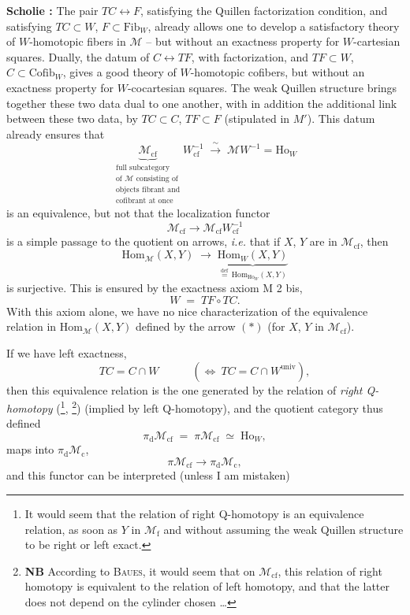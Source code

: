 \documentclass[11pt]{article}
\newcommand{\msp}[1]{\marginpar{\footnotesize [#1]}}
\newcommand{\univ}{\mathrm{univ}}
\newcommand{\Fib}{\mathrm{Fib}}
\begin{document}
\noindent\textbf{Scholie :} The pair $TC \longleftrightarrow F$, satisfying the Quillen factorization condition, and satisfying $TC \subset W$, $F \subset \Fib_W$, already allows one to develop a satisfactory theory of $W$-homotopic fibers in $\mathcal{M}$ -- but without an exactness property for $W$-cartesian squares. Dually, the datum of $C \longleftrightarrow TF$, with factorization, and $TF \subset W$, $C \subset \mathrm{Cofib}_W$, gives a good theory of $W$-homotopic cofibers, but without an exactness property for $W$-cocartesian squares. The weak Quillen structure brings together these two data dual to one another, with in addition the additional link between these two data, by $TC \subset C$, $TF \subset F$ (stipulated in $M'$). This datum already ensures that %
\[
\underbrace{\mathcal{M}_{\mathrm{cf}}}_{\substack{\text{full subcategory}\\ \text{of $\mathcal{M}$ consisting of}\\ \text{objects fibrant and}\\ \text{cofibrant at once}}} W_{\mathrm{cf}}^{-1} \;\xrightarrow{\ \sim\ }\; \mathcal{M}W^{-1} = \mathrm{Ho}_W
\]
\msp{page 30}
is an equivalence, but not that the localization functor
\[
\mathcal{M}_{\mathrm{cf}} \longrightarrow \mathcal{M}_{\mathrm{cf}}W_{\mathrm{cf}}^{-1}
\]
is a simple passage to the quotient on arrows, \textit{i.e.} that if $X$, $Y$ are in $\mathcal{M}_{\mathrm{cf}}$, then
\[
\mathrm{Hom}_{\mathcal{M}}(X, Y) \;\longrightarrow\; \underbrace{\mathrm{Hom}_W(X, Y)}_{\overset{\text{def}}{=}\,\mathrm{Hom}_{\mathrm{Ho}_W}(X, Y)} \tag*{$(*)$}
\]
is surjective. This is ensured by the exactness axiom M 2 bis,
\[
W \;=\; TF \circ TC.
\]
With this axiom alone, we have no nice characterization of the equivalence relation in $\mathrm{Hom}_{\mathcal{M}}(X, Y)$ defined by the arrow $(*)$ (for $X$, $Y$ in $\mathcal{M}_{\mathrm{cf}}$).

If we have left exactness,
\[
TC = C \cap W \qquad\quad (\Longleftrightarrow\ TC = C \cap W^{\univ}),
\]
then this equivalence relation is the one generated by the relation of \textit{right Q-homotopy} (\footnote[22]{It would seem that the relation of right Q-homotopy is an equivalence relation, as soon as $Y$ in $\mathcal{M}_{\mathrm{f}}$ and without assuming the weak Quillen structure to be right or left exact.}, \footnote[23]{\textbf{NB} According to \textsc{Baues}, it would seem that on $\mathcal{M}_{\mathrm{cf}}$, this relation of right homotopy is equivalent to the relation of left homotopy, and that the latter does not depend on the cylinder chosen \ldots}) (implied by left Q-homotopy), and the quotient category thus defined
\[
\pi_{\mathrm{d}}\mathcal{M}_{\mathrm{cf}} \;=\; \pi\mathcal{M}_{\mathrm{cf}} \;\simeq\; \mathrm{Ho}_W,
\]
maps into $\pi_{\mathrm{d}}\mathcal{M}_{\mathrm{c}}$,
\[
\pi\mathcal{M}_{\mathrm{cf}} \longrightarrow \pi_{\mathrm{d}}\mathcal{M}_{\mathrm{c}},
\]
and this functor can be interpreted (unless I am mistaken)
\end{document}
